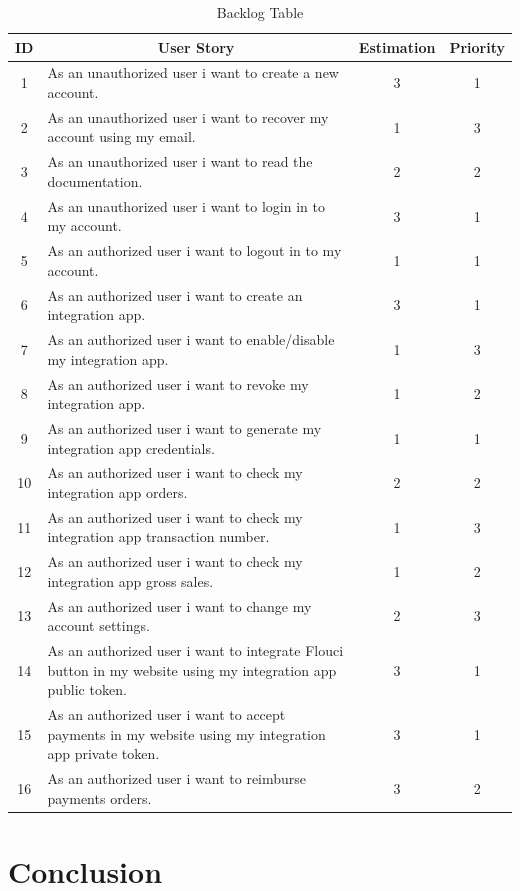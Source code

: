 \begin{spacing}{1.2}
\begin{table}[!h]
\centering
\caption{Backlog Table}
\begin{tabularx}{\linewidth}{|c|X|c|c|}
\hline
ID & \multicolumn{1}{c|}{User Story} & Estimation & Priority \\ \hline
1 & As an unauthorized user i want to create a new account. &  3 & 1  \\  \hline
2 & As an unauthorized user i want to recover my account using my email. &  1 & 3 \\ \hline
3 & As an unauthorized user i want to read the documentation. & 2 & 2 \\ \hline
4 & As an unauthorized user i want to login in to my account. & 3 & 1 \\ \hline
5 & As an authorized user i want to logout in to my account. & 1 & 1 \\ \hline
6 & As an authorized user i want to create an integration app. & 3 & 1 \\ \hline
7 & As an authorized user i want to  enable/disable my integration app. & 1 & 3 \\ \hline
8 & As an authorized user i want to  revoke my integration app. & 1 & 2 \\ \hline
9 & As an authorized user i want to  generate my integration app credentials. & 1 & 1 \\ \hline
10 & As an authorized user i want to check my integration app orders. & 2 & 2 \\ \hline
11 & As an authorized user i want to check my integration app transaction number. & 1 & 3 \\ \hline
12 & As an authorized user i want to check my integration app gross sales. & 1 & 2 \\ \hline
13 & As an authorized user i want to change my account settings. & 2 & 3 \\ \hline
14 & As an authorized user i want to integrate Flouci button in my website using my integration app public token. & 3 & 1 \\ \hline
15 & As an authorized user i want to accept payments in my website using my integration app private token. & 3 & 1 \\ \hline
16 & As an authorized user i want to reimburse payments orders. & 3 & 2 \\ \hline
\end{tabularx}
\end{table}

\section*{Conclusion}


\end{spacing}
